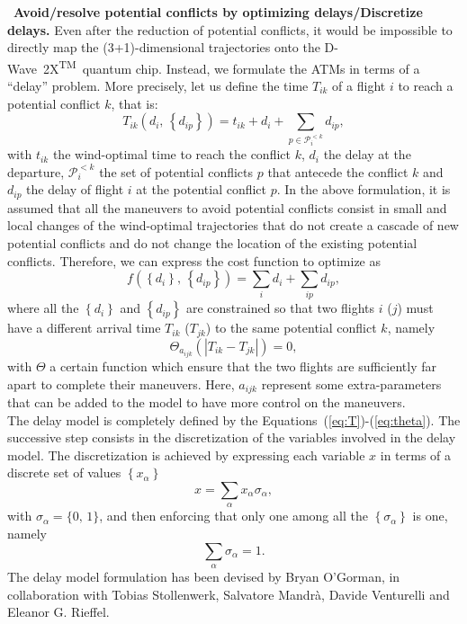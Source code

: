 \documentclass[9pt]{extarticle}
\newcommand{\equationname}{Equation}
\newcommand{\DW}{\mbox{D-Wave 2X\textsuperscript{TM}}~}
\begin{document}
\begin{changemargin}{0.5cm}{0cm}
\textbullet~\textbf{Avoid/resolve potential conflicts by optimizing delays/Discretize delays.} Even after the reduction of potential conflicts, it would be impossible to directly
map the (3+1)-dimensional trajectories onto the \DW quantum chip. Instead, we formulate the ATMs in terms of a ``delay'' problem. More precisely,
let us define the time $T_{ik}$ of a flight $i$ to reach a potential conflict $k$, that is:
\begin{equation}\label{eq:T}
	T_{ik}(d_i,\,\left\{d_{ip}\right\}) = t_{ik} + d_i + \sum_{p\in \mathcal{P}^{<k}_i} d_{ip},
\end{equation}
with $t_{ik}$ the wind-optimal time to reach the conflict $k$, $d_i$ the delay at the departure, 
$\mathcal{P}^{<k}_{i}$ the set of potential conflicts $p$ that antecede the conflict $k$ and $d_{ip}$ the delay
of flight $i$ at the potential conflict $p$. In the above formulation, it is assumed that all the maneuvers to avoid potential conflicts
consist in small and local changes of the wind-optimal trajectories that do not create a cascade of new potential conflicts and do not
change the location of the existing potential conflicts. Therefore, we can express the cost function to optimize as
\begin{equation}\label{eq:f}
	f(\left\{d_i\right\},\,\left\{d_{ip}\right\})= \sum_{i} d_i + \sum_{ip} d_{ip},
\end{equation}
where all the $\left\{d_i\right\}$ and $\left\{d_{ip}\right\}$ are constrained so that two flights $i$ ($j$) must have a different arrival time
$T_{ik}$ ($T_{jk}$) to the same potential conflict $k$, namely
\begin{equation}\label{eq:theta}
	\Theta_{a_{ijk}}(\left|T_{ik} - T_{jk}\right|) = 0,
\end{equation}
with $\Theta$ a certain function which ensure that the two flights are sufficiently far apart to complete their maneuvers. Here, $a_{ijk}$ represent
some extra-parameters that can be added to the model to have more control on the maneuvers.\\

\hspace{0.4cm}The delay model is completely defined by the \equationname{s}~(\ref{eq:T})-(\ref{eq:theta}). The successive step
consists in the discretization of the variables involved in the delay model. The discretization is achieved by expressing each variable $x$ in terms 
of a discrete set of values $\left\{x_\alpha\right\}$
\begin{equation}\label{eq:discr}
	x = \sum_{\alpha} x_{\alpha}\sigma_\alpha,
\end{equation}
with $\sigma_{\alpha} = \{0,\,1\}$, and then enforcing that only one among all the $\left\{\sigma_\alpha\right\}$ is one, namely
\begin{equation}\label{eq:constr}
	\sum_\alpha \sigma_\alpha = 1.
\end{equation}
The delay model formulation has been devised by Bryan O'Gorman,
in collaboration with Tobias Stollenwerk, Salvatore Mandr\`a, Davide Venturelli and Eleanor G. Rieffel.
\end{changemargin}
\end{document}
